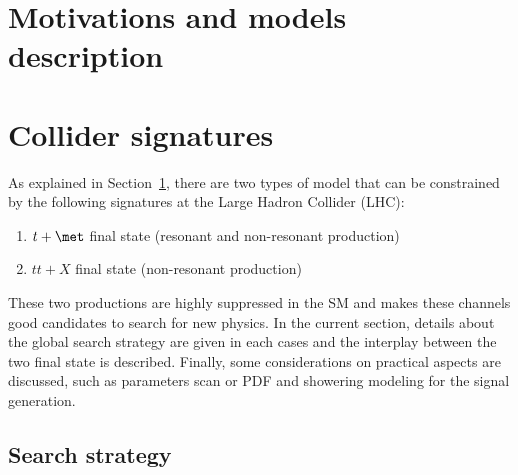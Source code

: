 \documentclass[UKenglish,texlive=2013]{\ATLASLATEXPATH atlasdoc}
\begin{document}
\maketitle

\tableofcontents

\clearpage

\section{Motivations and models description}
\label{sec:MotivModelDescription}



 
 

\section{Collider signatures}
\label{sec:ColliderSignature}
 
 As explained in Section~\ref{sec:MotivModelDescription}, there are two types of model that can be constrained by 
 the following signatures at the Large Hadron Collider (LHC):
 \begin{enumerate}
  \item $t+\met$ final state (resonant and non-resonant production)~\cite{ATLASmonotop,CMSmonotop,CDFmonotop}
  \item $tt+X$ final state (non-resonant production)~\cite{ATLASsamesigntop}
 \end{enumerate}
 These two productions are highly suppressed in the SM and makes these channels good candidates to search for new physics. In the current section, details about the global search strategy are given in each cases and the interplay between the two final state is described. Finally, some considerations on practical aspects are discussed, such as parameters scan or PDF and showering modeling for the signal generation.

 \subsection{Search strategy}
 
 
  
\end{document}
